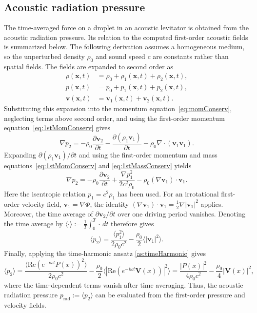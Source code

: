 \documentclass[final,12pt,nopreprintline,longtitle]{elsarticle}
\renewcommand{\v}{\mathbf{v}}
\newcommand{\V}{\mathbf{V}}
\newcommand{\x}{\mathbf{x}}
\begin{document}
\subsection{Acoustic radiation pressure}
The time-averaged force on a droplet in an acoustic levitator is obtained from
the acoustic radiation pressure. Its relation to the computed first-order
acoustic fields is summarized below.
The following derivation assumes a homogeneous medium, so the unperturbed
density $\rho_0$ and sound speed $c$ are constants rather than spatial fields.
The fields are expanded to second order as
\begin{equation}
    \begin{aligned}
        \rho(\x,t) &= \rho_0 + \rho_1(\x,t) + \rho_2(\x,t), \\
        p(\x,t) &= p_0 + p_1(\x,t) + p_2(\x,t), \\
        \v(\x,t) &= \v_1(\x,t) + \v_2(\x,t).
        \label{eq:2stPert}
    \end{aligned}
\end{equation}
Substituting this expansion into the momentum equation~\eqref{eq:momConserv},
neglecting terms above second order, and using the first-order momentum
equation~\eqref{eq:1stMomConserv} gives
\begin{equation}
    \nabla p_2 =
    -\rho_0\frac{\partial \v_2}{\partial t}
    -\frac{\partial (\rho_1\v_1)}{\partial t}
    -\rho_0\nabla\cdot(\v_1\v_1).
\end{equation}
Expanding $\partial(\rho_1\v_1)/\partial t$ and using the first-order
momentum and mass equations~\eqref{eq:1stMomConserv} and
\eqref{eq:1stMassConserv} yields
\begin{equation}
    \nabla p_2 =
    -\rho_0\frac{\partial \v_2}{\partial t}
    +\frac{\nabla p_1^2}{2c^2\rho_0}
    -\rho_0(\nabla\v_1)\cdot\v_1.
\end{equation}
Here the isentropic relation $p_1=c^2\rho_1$ has been used. For an
irrotational first-order velocity field, $\v_1=\nabla\Phi$, the identity
$(\nabla\v_1)\cdot\v_1=\frac{1}{2}\nabla|\v_1|^2$ applies. Moreover, the
time average of $\partial\v_2/\partial t$ over one driving period vanishes.
Denoting the time average by $\langle\cdot\rangle:= \frac{1}{T}\int_0^T \cdot \, dt$ therefore gives
\begin{equation}
    \langle p_2\rangle =
    \frac{\langle p_1^2\rangle}{2\rho_0c^2}
    -\frac{\rho_0}{2}\langle|\v_1|^2\rangle.
\end{equation}
Finally, applying the time-harmonic ansatz \cref{as:timeHarmonic} gives
\begin{equation}
    \langle p_2\rangle =
    \frac{\langle \mathrm{Re}(e^{-i\omega t}P(x))^2\rangle}{2\rho_0c^2}
    -\frac{\rho_0}{2}\langle|\mathrm{Re}(e^{-i\omega t}\V(x))|^2\rangle =  \frac{ |P(x)|^2}{4\rho_0c^2}
    -\frac{\rho_0}{4}|\V(x)|^2,
    \label{eq:acousticRadiationPressure}
\end{equation}
where the time-dependent terms vanish after time averaging.  Thus, the acoustic
radiation pressure $p_{\mathrm{rad}}:=\langle p_2\rangle$
can be evaluated from the first-order pressure and velocity fields.
\end{document}
